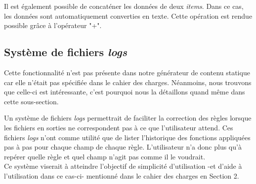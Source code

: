 		Il est également possible de concaténer les données de deux \textit{items}. Dans ce cas, les données sont automatiquement converties en texte. Cette opération est rendue possible grâce à l'opérateur "+".
	
	\subsection{Système de fichiers \textit{logs}}
	
		\begin{note}
			Cette fonctionnalité n'est pas présente dans notre générateur de contenu statique car elle n'était pas spécifiée dans le cahier des charges. Néanmoins, nous trouvons que celle-ci est intéressante, c'est pourquoi nous la détaillons quand même dans cette sous-section.
		\end{note}
	
		Un système de fichiers \textit{logs} permettrait de faciliter la correction des règles lorsque les fichiers en sorties ne correspondent pas à ce que l'utilisateur attend. Ces fichiers \textit{logs} n'ont comme utilité que de lister l'historique des fonctions appliquées pas à pas pour chaque champ de chaque règle. L'utilisateur n'a donc plus qu'à repérer quelle règle et quel champ n'agit pas comme il le voudrait.\\
		
		Ce système viserait à atteindre l'objectif de simplicité d'utilisation -et d'aide à l'utilisation dans ce cas-ci- mentionné dans le cahier des charges en Section 2.
		
		